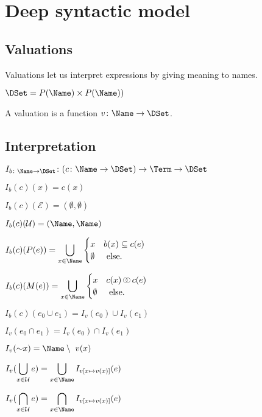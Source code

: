 \documentclass[oneside,12pt]{book}
\theoremstyle{definition}
\theoremstyle{remark}
\newcommand{\ct}{{\sim}} %
\newcommand\var[1]{\mathop{\mathit{#1}}\nolimits}
\newcommand{\pSet}{P}
\newcommand{\mSet}{M}
\newcommand{\Empty}{\mathcal{E}}
\newcommand{\Universal}{\mathcal{U}}
\newcommand\Circle{\raisebox{0.45mm}{\scalebox{0.6}{$\bigcirc$}}}
\newcommand{\meet}{\var{\mathrlap{\Circle}\hspace{3.2pt}\Circle}}
\begin{document}
\section{Deep syntactic model}

\subsection{Valuations}
Valuations let us interpret expressions by giving meaning to names.

\begin{defBox}
  $\DSet = P(\Name) \times P(\Name))$
  
  \medskip \noindent
  A valuation is a function $v\colon \Name \to \DSet$.
\end{defBox}

\subsection{Interpretation}

\begin{defBox}
  $I_{b\colon \Name \to \DSet}\colon (c\colon \Name \to \DSet) \to \Term \to \DSet$
  
  \medskip \noindent $I_b(c)(x) = c(x)$
  
  \medskip \noindent $I_b(c)(\Empty) = (\emptyset, \emptyset)$
  
  \noindent $I_b(c)(\Universal) = (\Name, \Name)$
  
  \noindent $I_b(c)(\pSet(e)) = \displaystyle\bigcup_{x \in \Name}\begin{cases}
    x & b(x) \subseteq c(e) \\
    \emptyset & \text{ else.}
  \end{cases}$
  
  \medskip \noindent $I_b(c)(\mSet(e)) = \displaystyle\bigcup_{x \in \Name}\begin{cases}
    x & c(x) \meet c(e) \\
    \emptyset & \text{ else.}
  \end{cases}$
  
  \medskip \noindent $I_b(c)(e_0 \cup e_1) = I_v(e_0) \cup I_v(e_1)$
  
  \noindent $I_v(e_0 \cap e_1) = I_v(e_0) \cap I_v(e_1)$
  
  \noindent $I_v(\ct x) = \Name \setminus~v(x)$
  
  \medskip \noindent $\displaystyle I_v(\bigcup_{x \in \Universal}e) =
    \bigcup_{x \in \Name}I_{v[x \mapsto v(x)]}(e)$
  
  \medskip \noindent $\displaystyle I_v(\bigcap_{x \in \Universal}e) =
    \bigcap_{x \in \Name}I_{v[x \mapsto v(x)]}(e)$
  
\end{defBox}
\end{document}
